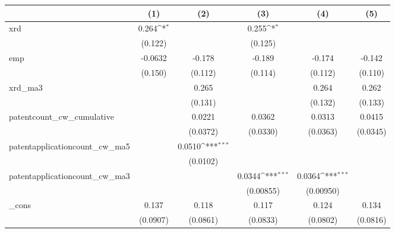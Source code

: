 {
\def\sym#1{\ifmmode^{#1}\else\(^{#1}\)\fi}
\begin{tabular}{l*{5}{c}}
\hline\hline
            &\multicolumn{1}{c}{(1)}         &\multicolumn{1}{c}{(2)}         &\multicolumn{1}{c}{(3)}         &\multicolumn{1}{c}{(4)}         &\multicolumn{1}{c}{(5)}         \\
\hline
xrd         &       0.264\sym{*}  &                     &       0.255\sym{*}  &                     &                     \\
            &     (0.122)         &                     &     (0.125)         &                     &                     \\
[1em]
emp         &     -0.0632         &      -0.178         &      -0.189         &      -0.174         &      -0.142         \\
            &     (0.150)         &     (0.112)         &     (0.114)         &     (0.112)         &     (0.110)         \\
[1em]
xrd\_ma3     &                     &       0.265         &                     &       0.264         &       0.262         \\
            &                     &     (0.131)         &                     &     (0.132)         &     (0.133)         \\
[1em]
patentcount\_cw\_cumulative&                     &      0.0221         &      0.0362         &      0.0313         &      0.0415         \\
            &                     &    (0.0372)         &    (0.0330)         &    (0.0363)         &    (0.0345)         \\
[1em]
patentapplicationcount\_cw\_ma5&                     &      0.0510\sym{***}&                     &                     &                     \\
            &                     &    (0.0102)         &                     &                     &                     \\
[1em]
patentapplicationcount\_cw\_ma3&                     &                     &      0.0344\sym{***}&      0.0364\sym{***}&                     \\
            &                     &                     &   (0.00855)         &   (0.00950)         &                     \\
[1em]
\_cons      &       0.137         &       0.118         &       0.117         &       0.124         &       0.134         \\
            &    (0.0907)         &    (0.0861)         &    (0.0833)         &    (0.0802)         &    (0.0816)         \\

\end{tabular}}
